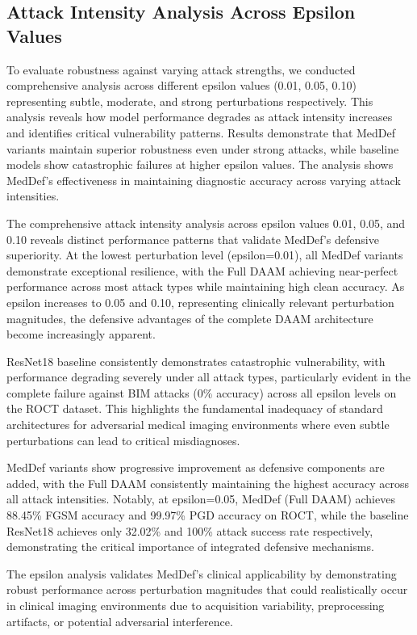 \documentclass[preprint,12pt]{elsarticle}
\begin{document}
\subsection{Attack Intensity Analysis Across Epsilon Values}
To evaluate robustness against varying attack strengths, we conducted comprehensive analysis across different epsilon values (0.01, 0.05, 0.10) representing subtle, moderate, and strong perturbations respectively. This analysis reveals how model performance degrades as attack intensity increases and identifies critical vulnerability patterns. Results demonstrate that MedDef variants maintain superior robustness even under strong attacks, while baseline models show catastrophic failures at higher epsilon values. The analysis shows MedDef's effectiveness in maintaining diagnostic accuracy across varying attack intensities.

The comprehensive attack intensity analysis across epsilon values 0.01, 0.05, and 0.10 reveals distinct performance patterns that validate MedDef's defensive superiority. At the lowest perturbation level (epsilon=0.01), all MedDef variants demonstrate exceptional resilience, with the Full DAAM achieving near-perfect performance across most attack types while maintaining high clean accuracy. As epsilon increases to 0.05 and 0.10, representing clinically relevant perturbation magnitudes, the defensive advantages of the complete DAAM architecture become increasingly apparent.

ResNet18 baseline consistently demonstrates catastrophic vulnerability, with performance degrading severely under all attack types, particularly evident in the complete failure against BIM attacks (0\% accuracy) across all epsilon levels on the ROCT dataset. This highlights the fundamental inadequacy of standard architectures for adversarial medical imaging environments where even subtle perturbations can lead to critical misdiagnoses.

MedDef variants show progressive improvement as defensive components are added, with the Full DAAM consistently maintaining the highest accuracy across all attack intensities. Notably, at epsilon=0.05, MedDef (Full DAAM) achieves 88.45\% FGSM accuracy and 99.97\% PGD accuracy on ROCT, while the baseline ResNet18 achieves only 32.02\% and 100\% attack success rate respectively, demonstrating the critical importance of integrated defensive mechanisms.

The epsilon analysis validates MedDef's clinical applicability by demonstrating robust performance across perturbation magnitudes that could realistically occur in clinical imaging environments due to acquisition variability, preprocessing artifacts, or potential adversarial interference.
\end{document}
